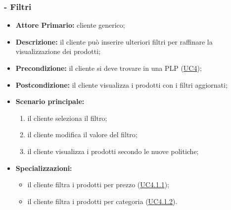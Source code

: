 \subsubsection{ - Filtri}
\begin{itemize}
    \item \textbf{Attore Primario:} cliente generico;
    \item \textbf{Descrizione:} il cliente può inserire ulteriori filtri per raffinare la visualizzazione dei prodotti;
    \item \textbf{Precondizione:} il cliente si deve trovare in una PLP (\hyperref[UC4]{UC4});
    \item \textbf{Postcondizione:} il cliente visualizza i prodotti con i filtri aggiornati;
    \item \textbf{Scenario principale:}
          \begin{enumerate}
              \item il cliente seleziona il filtro;
              \item il cliente modifica il valore del filtro;
              \item il cliente visualizza i prodotti secondo le nuove politiche;
          \end{enumerate}
    \item \textbf{Specializzazioni: }
          \begin{itemize}
              \item il cliente filtra i prodotti per prezzo (\hyperref[UC4.1.1]{UC4.1.1});
              \item il cliente filtra i prodotti per categoria (\hyperref[UC4.1.2]{UC4.1.2}).
          \end{itemize}
\end{itemize}

\stepsubsubUserCase
